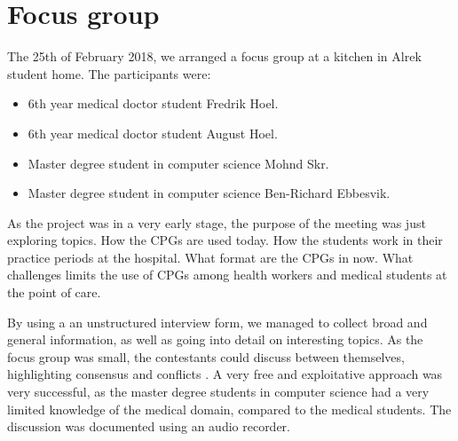 \section{Focus group}
The 25th of February 2018, we arranged a focus group at a kitchen in Alrek student home. The participants were:
\begin{itemize}
	\item 6th year medical doctor student Fredrik Hoel.
	\item 6th year medical doctor student August Hoel.
	\item Master degree student in computer science Mohnd Skr.
	\item Master degree student in computer science Ben-Richard Ebbesvik.
\end{itemize}

As the project was in a very early stage, the purpose of the meeting was just exploring topics. How the CPGs are used today. How the students work in their practice periods at the hospital. What format are the CPGs in now. What challenges limits the use of CPGs among health workers and medical students at the point of care.

By using a an unstructured interview form, we managed to collect broad and general information, as well as going into detail on interesting topics. As the focus group was small, the contestants could discuss between themselves, highlighting consensus and conflicts \cite{Preece2015}. A very free and exploitative approach was very successful, as the master degree students in computer science had a very limited knowledge of the medical domain, compared to the medical students. The discussion was documented using an audio recorder.

